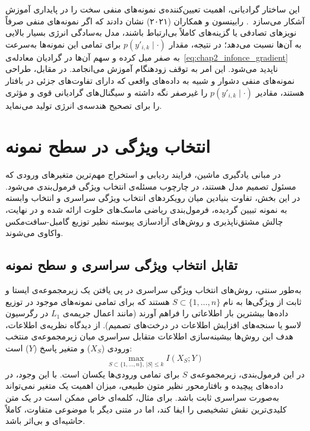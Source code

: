 این ساختار گرادیانی، اهمیت تعیین‌کننده‌ی نمونه‌های منفی سخت را در پایداری آموزش آشکار می‌سازد~\cite{robinson2021contrastive}. رابینسون و همکاران (۲۰۲۱) نشان دادند که اگر نمونه‌های منفی صرفاً نویزهای تصادفی یا گزینه‌های کاملاً بی‌ارتباط باشند، مدل به‌سادگی انرژی بسیار بالایی به آن‌ها نسبت می‌دهد؛ در نتیجه، مقدار $p(y'_{i, k} \mid \cdot)$ برای تمامی این نمونه‌ها به‌سرعت به صفر میل کرده و سهم آن‌ها در گرادیان معادله‌ی~\ref{eq:chap2_infonce_gradient} ناپدید می‌شود. این امر به توقف زودهنگام آموزش می‌انجامد. در مقابل، طراحی نمونه‌های منفی دشوار و شبیه به داده‌های واقعی که دارای تفاوت‌های جزئی در بافتار هستند، مقادیر $p(y'_{i, k} \mid \cdot)$ را غیرصفر نگه داشته و سیگنال‌های گرادیانی قوی و مؤثری را برای تصحیح هندسه‌ی انرژی تولید می‌نماید.



\section{انتخاب ویژگی در سطح نمونه}\label{sec:2-5}

در مبانی یادگیری ماشین، فرایند ردیابی و استخراج مهم‌ترین متغیرهای ورودی که مسئول تصمیم مدل هستند، در چارچوب مسئله‌ی انتخاب ویژگی فرمول‌بندی می‌شود. در این بخش، تفاوت بنیادین میان رویکردهای انتخاب ویژگی سراسری و انتخاب وابسته به نمونه تبیین گردیده، فرمول‌بندی ریاضی ماسک‌های خلوت ارائه شده و در نهایت، چالش مشتق‌ناپذیری و روش‌های آزادسازی پیوسته نظیر توزیع گامبل-سافت‌مکس واکاوی می‌شوند.


\subsection{تقابل انتخاب ویژگی سراسری و سطح نمونه}\label{sec:2-5-1}

به‌طور سنتی، روش‌های انتخاب ویژگی سراسری در پی یافتن یک زیرمجموعه‌ی ایستا و ثابت از ویژگی‌ها به نام $S \subset \{1, \dots, n\}$ هستند که برای تمامی نمونه‌های موجود در توزیع داده‌ها بیشترین بار اطلاعاتی را فراهم آورند (مانند اعمال جریمه‌ی $L_1$ در رگرسیون لاسو یا سنجه‌های افزایش اطلاعات در درخت‌های تصمیم). از دیدگاه نظریه‌ی اطلاعات، هدف این روش‌ها بیشینه‌سازی اطلاعات متقابل سراسری میان زیرمجموعه‌ی منتخب ورودی ($X_S$) و متغیر پاسخ ($Y$) است:
\begin{equation}\label{eq:chap2_global_fs}
    \max_{S \subset \{1, \dots, n\}, \, |S| \le k} I(X_S; Y)
\end{equation}
در این فرمول‌بندی، زیرمجموعه‌ی $S$ برای تمامی ورودی‌ها یکسان است. با این وجود، در داده‌های پیچیده و بافتارمحور نظیر متون طبیعی، میزان اهمیت یک متغیر نمی‌تواند به‌صورت سراسری ثابت باشد. برای مثال، کلمه‌ای خاص ممکن است در یک متن کلیدی‌ترین نقش تشخیصی را ایفا کند، اما در متنی دیگر با موضوعی متفاوت، کاملاً حاشیه‌ای و بی‌اثر باشد.

